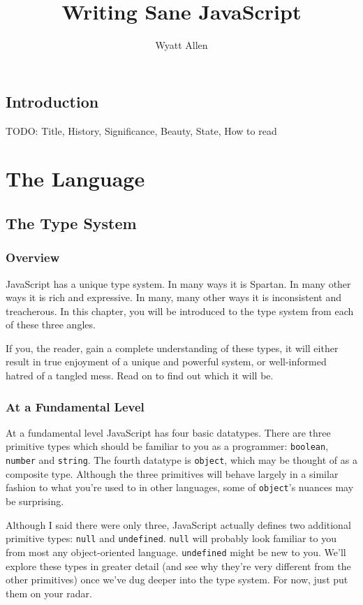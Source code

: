 \documentclass[11pt,letter]{book}
\begin{document}
    \title{Writing Sane JavaScript}
    \author{Wyatt Allen}
    \maketitle
    
    \chapter{Introduction}
    TODO: Title, History, Significance, Beauty, State, How to read
    
    \part{The Language}
    \chapter{The Type System}
    \section{Overview}
    JavaScript has a unique type system. In many ways it is Spartan. In many other ways 
    it is rich and expressive. In many, many other ways it is inconsistent and treacherous.
    In this chapter, you will be introduced to the type system from each of these three 
    angles.
    
    If you, the reader, gain a complete understanding of these types, it will either result 
    in true enjoyment of a unique and powerful system, or well-informed hatred of a tangled 
    mess. Read on to find out which it will be.
    
    \section{At a Fundamental Level}
    At a fundamental level JavaScript has four basic datatypes. There are three primitive 
    types which should be familiar to you as a programmer: \texttt{boolean}, \texttt{number} 
    and \texttt{string}. The fourth datatype is \texttt{object}, which may be thought of as a 
    composite type. Although the three primitives will behave largely in a similar 
    fashion to what you're used to in other languages, some of \texttt{object}'s nuances 
    may be surprising.
    
    Although I said there were only three, JavaScript actually defines two additional primitive 
    types: \texttt{null} and \texttt{undefined}. \texttt{null} will probably look familiar to 
    you from most any object-oriented language. \texttt{undefined} might be new to you. We'll 
    explore these types in greater detail (and see why they're very different from the other 
    primitives) once we've dug deeper into the type system. For now, just put them on your radar.
    
\end{document}
